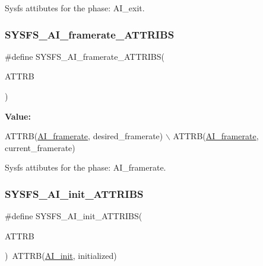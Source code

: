 Sysfs attibutes for the phase\+: A\+I\+\_\+exit. 

\mbox{\label{group__sysfs__attrb__init_ga081f30ac6549e4ea9c45c9b37849849f}} 
\subsubsection{\texorpdfstring{S\+Y\+S\+F\+S\+\_\+\+A\+I\+\_\+framerate\+\_\+\+A\+T\+T\+R\+I\+BS}{SYSFS\_AI\_framerate\_ATTRIBS}}
{\footnotesize\ttfamily \#define S\+Y\+S\+F\+S\+\_\+\+A\+I\+\_\+framerate\+\_\+\+A\+T\+T\+R\+I\+BS(\begin{DoxyParamCaption}\item[{}]{A\+T\+T\+RB }\end{DoxyParamCaption})}

{\bfseries Value\+:}
\begin{DoxyCode}
ATTRB(\hyperlink{AI__gov__phases_8h_a59664fef4d2987410ea13b917756d6aca73b556518e84eeece38f2aa34ab12782}{AI\_framerate}, desired\_framerate) \(\backslash\)
            ATTRB(\hyperlink{AI__gov__phases_8h_a59664fef4d2987410ea13b917756d6aca73b556518e84eeece38f2aa34ab12782}{AI\_framerate}, current\_framerate)
\end{DoxyCode}


Sysfs attibutes for the phase\+: A\+I\+\_\+framerate. 

\mbox{\label{group__sysfs__attrb__init_gac8d2c69a96b1110b2a84d9989e6ac890}} 
\subsubsection{\texorpdfstring{S\+Y\+S\+F\+S\+\_\+\+A\+I\+\_\+init\+\_\+\+A\+T\+T\+R\+I\+BS}{SYSFS\_AI\_init\_ATTRIBS}}
{\footnotesize\ttfamily \#define S\+Y\+S\+F\+S\+\_\+\+A\+I\+\_\+init\+\_\+\+A\+T\+T\+R\+I\+BS(\begin{DoxyParamCaption}\item[{}]{A\+T\+T\+RB }\end{DoxyParamCaption})~A\+T\+T\+RB(\hyperlink{AI__gov__phases_8h_a59664fef4d2987410ea13b917756d6aca4469416d883468c62e85fa1412644678}{A\+I\+\_\+init}, initialized)}



